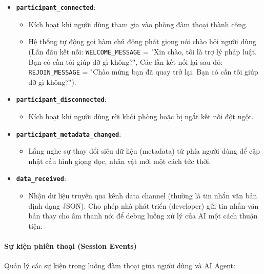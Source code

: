 \begin{itemize}
\item \textbf{\texttt{participant\_connected}}:
\begin{itemize}
\item Kích hoạt khi người dùng tham gia vào phòng đàm thoại thành công.
\item Hệ thống tự động gọi hàm chủ động phát giọng nói chào hỏi người dùng (Lần đầu kết nối: \texttt{WELCOME\_MESSAGE} = "Xin chào, tôi là trợ lý pháp luật. Bạn có cần tôi giúp đỡ gì không?", Các lần kết nối lại sau đó: \texttt{REJOIN\_MESSAGE} = "Chào mừng bạn đã quay trở lại. Bạn có cần tôi giúp đỡ gì không?").
\end{itemize}

\item \textbf{\texttt{participant\_disconnected}}:
\begin{itemize}
\item Kích hoạt khi người dùng rời khỏi phòng hoặc bị ngắt kết nối đột ngột.
\end{itemize}

\item \textbf{\texttt{participant\_metadata\_changed}}:
\begin{itemize}
\item Lắng nghe sự thay đổi siêu dữ liệu (metadata) từ phía người dùng để cập nhật cấu hình giọng đọc, nhân vật mới một cách tức thời.
\end{itemize}

\item \textbf{\texttt{data\_received}}:
\begin{itemize}
\item Nhận dữ liệu truyền qua kênh data channel (thường là tin nhắn văn bản định dạng JSON). Cho phép nhà phát triển (developer) gửi tin nhắn văn bản thay cho âm thanh nói để debug luồng xử lý của AI một cách thuận tiện.
\end{itemize}
\end{itemize}

\paragraph{Sự kiện phiên thoại (Session Events)}

Quản lý các sự kiện trong luồng đàm thoại giữa người dùng và AI Agent:

